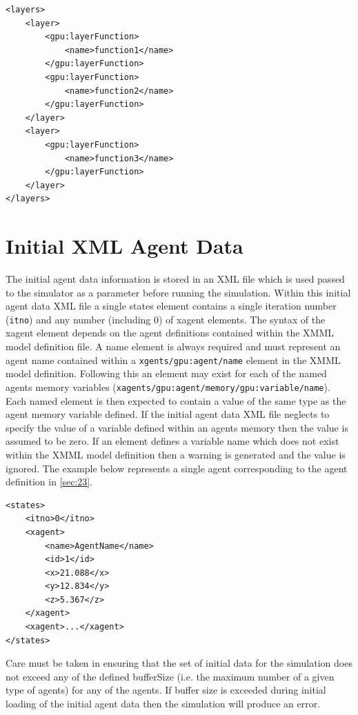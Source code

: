 \documentclass[11pt, a4paper, onecolumn, oneside]{report}
\begin{document}
\begin{verbatim}
<layers>
    <layer>
        <gpu:layerFunction>
            <name>function1</name>
        </gpu:layerFunction>
        <gpu:layerFunction>
            <name>function2</name>
        </gpu:layerFunction>
    </layer>
    <layer>
        <gpu:layerFunction>
            <name>function3</name>
        </gpu:layerFunction>
    </layer>
</layers>
\end{verbatim}


\section{Initial XML Agent Data}
\label{sec:27}


The initial agent data information is stored in an XML file which is used passed to the simulator as a parameter before running the simulation.
Within this initial agent data XML file a single states element contains a single iteration number (\texttt{itno}) and any number (including 0) of xagent elements.
The syntax of the xagent element depends on the agent definitions contained within the XMML model definition file.
A name element is always required and must represent an agent name contained within a \texttt{xgents/gpu:agent/name} element in the XMML model definition.
Following this an element may exist for each of the named agents memory variables (\texttt{xagents/gpu:agent/memory/gpu:variable/name}).
Each named element is then expected to contain a value of the same type as the agent memory variable defined.
If the initial agent data XML file neglects to specify the value of a variable defined within an agents memory then the value is assumed to be zero.
If an element defines a variable name which does not exist within the XMML model definition then a warning is generated and the value is ignored.
The example below represents a single agent corresponding to the agent definition in \cref{sec:23}.

\begin{verbatim}
<states>
    <itno>0</itno>
    <xagent>
        <name>AgentName</name>
        <id>1</id>
        <x>21.088</x>
        <y>12.834</y>
        <z>5.367</z>
    </xagent>
    <xagent>...</xagent>
</states>
\end{verbatim}

Care must be taken in ensuring that the set of initial data for the simulation does not exceed any of the defined bufferSize (i.e. the maximum number of a given type of agents) for any of the agents.
If buffer size is exceeded during initial loading of the initial agent data then the simulation will produce an error.
\end{document}
